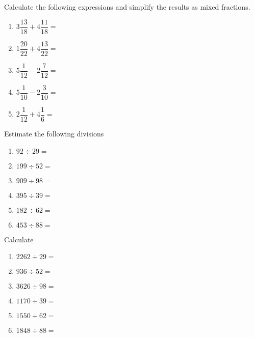 \documentclass[letterpaper,12pt]{article}
\author{Shawn Ma}
\date{\today}
\begin{document}
\setlength{\parindent}{0pt}
Calculate the following expressions and simplify the results as mixed fractions.

\begin{enumerate}
\item $3\dfrac{13}{18}+4\dfrac{11}{18}=$
\item $1\dfrac{20}{22}+4\dfrac{13}{22}=$
\item $5\dfrac{1}{12}-2\dfrac{7}{12}=$
\item $5\dfrac{1}{10}-2\dfrac{3}{10}=$
\item $2\dfrac{1}{12}+4\dfrac{1}{6}=$
\end{enumerate}

Estimate the following divisions
\begin{enumerate}[resume]
\item $92\div 29=$
\item $199\div 52=$
\item $909\div 98=$
\item $395\div 39=$
\item $182\div 62=$
\item $453\div 88=$ 
\end{enumerate}

Calculate
\begin{enumerate}[resume]
    \item $2262\div 29=$
    \item $936\div 52=$
    \item $3626\div 98=$
    \item $1170\div 39=$
    \item $1550\div 62=$
    \item $1848\div 88=$ 
    \end{enumerate}
\end{document}
